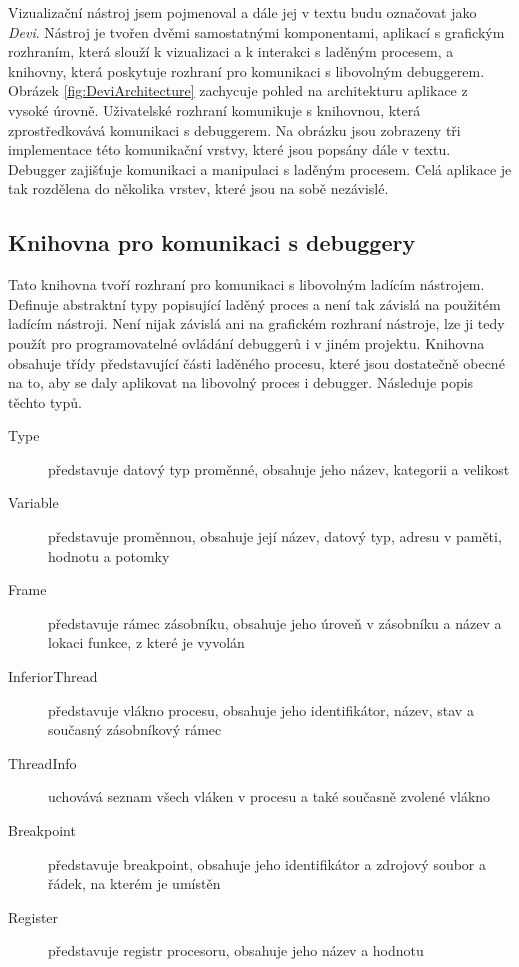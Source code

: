 \documentclass[bc,male,python,dept460]{diploma}						%
\newcommand{\parspace}[1][]{
	\ifthenelse{\isempty{#1}}{\vspace{5mm}}{\vspace{#1}}
	\par
}
\begin{document}
	\parspace Vizualizační nástroj jsem pojmenoval a dále jej v textu budu označovat jako \textit{Devi}.
	Nástroj je tvořen dvěmi samostatnými komponentami, aplikací s grafickým rozhraním, která slouží k vizualizaci a k interakci s laděným procesem, a knihovny,
	která poskytuje rozhraní pro komunikaci s libovolným debuggerem. Obrázek \ref{fig:DeviArchitecture} zachycuje pohled na architekturu aplikace z vysoké úrovně.
	Uživatelské rozhraní komunikuje s knihovnou, která zprostředkovává komunikaci s debuggerem. Na obrázku jsou zobrazeny tři implementace této komunikační vrstvy,
	které jsou popsány dále v textu. Debugger zajišťuje komunikaci a manipulaci s laděným procesem. Celá aplikace je tak rozdělena do několika
	vrstev, které jsou na sobě nezávislé.
	
		
	\subsection{Knihovna pro komunikaci s debuggery}
		Tato knihovna tvoří rozhraní pro komunikaci s libovolným ladícím nástrojem. Definuje abstraktní typy popisující laděný proces a není tak závislá na
		použitém ladícím nástroji. Není nijak závislá ani na grafickém rozhraní nástroje, lze ji tedy použít pro programovatelné ovládání debuggerů i v jiném
		projektu. Knihovna obsahuje třídy představující části laděného procesu, které jsou dostatečně obecné na to, aby se daly aplikovat na libovolný
		proces i debugger. Následuje popis těchto typů.
		
		\begin{description}
			\item[Type] představuje datový typ proměnné, obsahuje jeho název, kategorii a velikost
			\item[Variable] představuje proměnnou, obsahuje její název, datový typ, adresu v paměti, hodnotu a potomky
			\item[Frame] představuje rámec zásobníku, obsahuje jeho úroveň v zásobníku a název a lokaci funkce, z které je vyvolán %
			\item[InferiorThread] představuje vlákno procesu, obsahuje jeho identifikátor, název, stav a současný zásobníkový rámec
			\item[ThreadInfo] uchovává seznam všech vláken v procesu a také současně zvolené vlákno
			\item[Breakpoint] představuje breakpoint, obsahuje jeho identifikátor a zdrojový soubor a řádek, na kterém je umístěn
			\item[Register] představuje registr procesoru, obsahuje jeho název a hodnotu
		\end{description}
		
\end{document}
